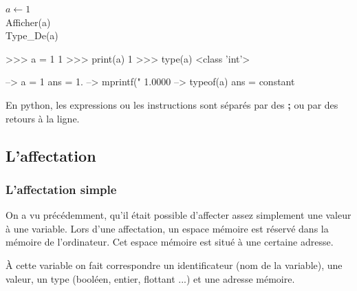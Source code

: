 \documentclass[10pt,fleqn]{article} %
\begin{document}
\begin{minipage}[c]{.3\linewidth}
\begin{pseudo}
\begin{algorithm}[H]
$a\gets 1$\\
Afficher(a)\\
Type\_De(a)
\end{algorithm}
\end{pseudo}
\end{minipage} \hfill
\begin{minipage}[c]{.3\linewidth} 
\begin{py}
\begin{python}
>>> a = 1
	1
>>> print(a)
	1
>>> type(a)
	<class 'int'>
\end{python}
\end{py}
\end{minipage}\hfill
\begin{minipage}[c]{.3\linewidth}
\begin{sci}
\begin{scilab}
--> a = 1
	ans = 1.
--> mprintf("%
	1.0000
--> typeof(a)
	ans = constant
\end{scilab}
\end{sci}
\end{minipage}



\begin{rem}
En python, les expressions ou les instructions sont séparés par des \textbf{;} ou par des retours à la ligne.
\end{rem}


\subsection{L'affectation}

\subsubsection{L'affectation simple}
On a vu précédemment, qu'il était possible d'affecter assez simplement une valeur à une variable. Lors d'une affectation, 
un espace mémoire est réservé dans la mémoire de l'ordinateur. Cet espace mémoire est situé à une certaine adresse.

À cette variable on fait correspondre un identificateur (nom de la variable), une valeur, un type (booléen, entier, flottant ...) et une adresse mémoire.
\end{document}
